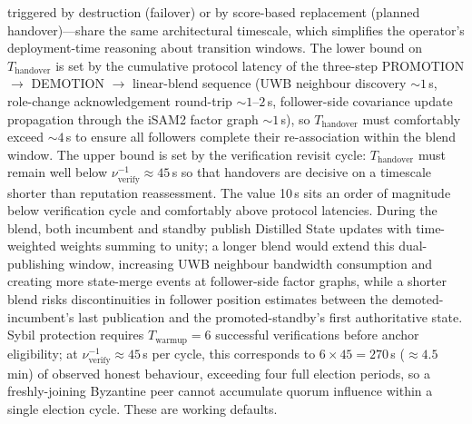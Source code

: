 \documentclass[conference,10pt]{IEEEtran}
\begin{document}
triggered by destruction (failover) or by score-based replacement (planned handover)---share the same architectural timescale, which simplifies the operator's deployment-time reasoning about transition windows. The lower bound on $T_\text{handover}$ is set by the cumulative protocol latency of the three-step PROMOTION $\to$ DEMOTION $\to$ linear-blend sequence (UWB neighbour discovery $\sim 1$\,s, role-change acknowledgement round-trip $\sim 1$--$2$\,s, follower-side covariance update propagation through the iSAM2 factor graph $\sim 1$\,s), so $T_\text{handover}$ must comfortably exceed $\sim 4$\,s to ensure all followers complete their re-association within the blend window. The upper bound is set by the verification revisit cycle: $T_\text{handover}$ must remain well below $\nu_\text{verify}^{-1}\approx 45$\,s so that handovers are decisive on a timescale shorter than reputation reassessment. The value 10\,s sits an order of magnitude below verification cycle and comfortably above protocol latencies. During the blend, both incumbent and standby publish Distilled State updates with time-weighted weights summing to unity; a longer blend would extend this dual-publishing window, increasing UWB neighbour bandwidth consumption and creating more state-merge events at follower-side factor graphs, while a shorter blend risks discontinuities in follower position estimates between the demoted-incumbent's last publication and the promoted-standby's first authoritative state. Sybil protection requires $T_\text{warmup} = 6$ successful verifications before anchor eligibility; at $\nu_\text{verify}^{-1}\approx 45$\,s per cycle, this corresponds to $6\times 45=270$\,s ($\approx 4.5$\,min) of observed honest behaviour, exceeding four full election periods, so a freshly-joining Byzantine peer cannot accumulate quorum influence within a single election cycle. These are working defaults.
\end{document}

